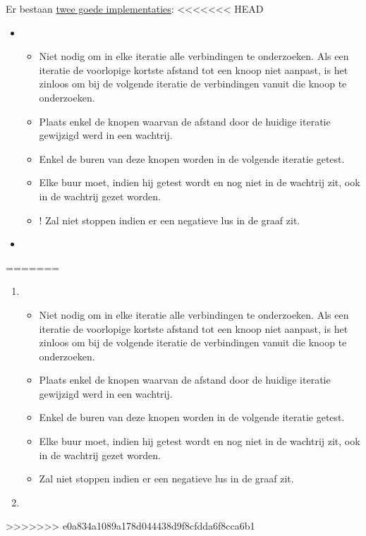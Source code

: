 \documentclass{report}
\begin{document}
Er bestaan \underline{twee goede implementaties}:
<<<<<<< HEAD
\begin{itemize}
	\item \begin{itemize}
		\item Niet nodig om in elke iteratie alle verbindingen te onderzoeken. Als een iteratie de voorlopige kortste afstand tot een knoop niet aanpast, is het zinloos om bij de volgende iteratie de verbindingen vanuit die knoop te onderzoeken.
		\item Plaats enkel de knopen waarvan de afstand door de huidige iteratie gewijzigd werd in een wachtrij.
		\item Enkel de buren van deze knopen worden in de volgende iteratie getest.
		\item Elke buur moet, indien hij getest wordt en nog niet in de wachtrij zit, ook in de wachtrij gezet worden.
		\item ! Zal niet stoppen indien er een negatieve lus in de graaf zit. 
	\end{itemize}
	\item {}

\end{itemize}
=======
\begin{enumerate}
	\item \begin{itemize}
		\item [\info] Niet nodig om in elke iteratie alle verbindingen te onderzoeken. Als een iteratie de voorlopige kortste afstand tot een knoop niet aanpast, is het zinloos om bij de volgende iteratie de verbindingen vanuit die knoop te onderzoeken.
		\item [\info] Plaats enkel de knopen waarvan de afstand door de huidige iteratie gewijzigd werd in een wachtrij.
		\item [\info] Enkel de buren van deze knopen worden in de volgende iteratie getest.
		\item [\info] Elke buur moet, indien hij getest wordt en nog niet in de wachtrij zit, ook in de wachtrij gezet worden.
		\item [\alert] Zal niet stoppen indien er een negatieve lus in de graaf zit. 
	\end{itemize}
	\item {}

\end{enumerate}
>>>>>>> e0a834a1089a178d044438d9f8cfdda6f8cca6b1
\end{document}
